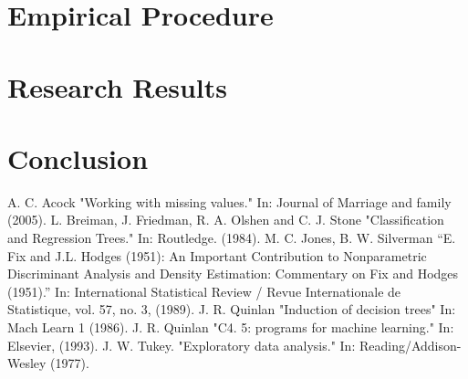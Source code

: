 \documentclass[10pt, conference]{IEEEtran}
\begin{document}
\section{Empirical Procedure}
\section{Research Results}
\section{Conclusion}
\begin{thebibliography}{00}
     A. C. Acock "Working with missing values." In: Journal of Marriage and family (2005).
     L. Breiman, J. Friedman, R. A. Olshen and C. J. Stone "Classification and Regression Trees." In: Routledge.  (1984).
     M. C. Jones, B. W. Silverman “E. Fix and J.L. Hodges (1951): An Important Contribution to Nonparametric Discriminant Analysis and Density Estimation: Commentary on Fix and Hodges (1951).” In: International Statistical Review / Revue Internationale de Statistique, vol. 57, no. 3, (1989).
     J. R. Quinlan "Induction of decision trees" In: Mach Learn 1 (1986).
     J. R. Quinlan "C4. 5: programs for machine learning." In: Elsevier, (1993).
     J. W. Tukey. "Exploratory data analysis." In: Reading/Addison-Wesley (1977).
\end{thebibliography}


\printglossary[type=\acronymtype]

\clearpage
\end{document}
